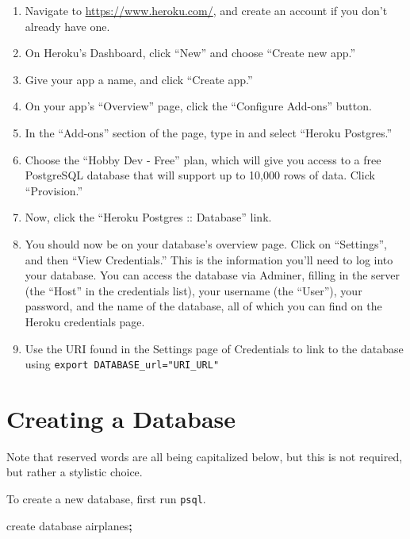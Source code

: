 \documentclass[]{book}
\newenvironment{Shaded}{\begin{snugshade}}{\end{snugshade}}
\newcommand{\KeywordTok}[1]{\textcolor[rgb]{0.13,0.29,0.53}{\textbf{#1}}}
\newcommand{\ExtensionTok}[1]{#1}
\newcommand{\NormalTok}[1]{#1}
\providecommand{\tightlist}{%
  \setlength{\itemsep}{0pt}\setlength{\parskip}{0pt}}
\begin{document}
\begin{enumerate}
\def\labelenumi{\arabic{enumi}.}
\tightlist
\item
  Navigate to \url{https://www.heroku.com/}, and create an account if
  you don't already have one.
\item
  On Heroku's Dashboard, click ``New'' and choose ``Create new app.''
\item
  Give your app a name, and click ``Create app.''
\item
  On your app's ``Overview'' page, click the ``Configure Add-ons''
  button.
\item
  In the ``Add-ons'' section of the page, type in and select ``Heroku
  Postgres.''
\item
  Choose the ``Hobby Dev - Free'' plan, which will give you access to a
  free PostgreSQL database that will support up to 10,000 rows of data.
  Click ``Provision.''
\item
  Now, click the ``Heroku Postgres :: Database'' link.
\item
  You should now be on your database's overview page. Click on
  ``Settings'', and then ``View Credentials.'' This is the information
  you'll need to log into your database. You can access the database via
  Adminer, filling in the server (the ``Host'' in the credentials list),
  your username (the ``User''), your password, and the name of the
  database, all of which you can find on the Heroku credentials page.
\item
  Use the URI found in the Settings page of Credentials to link to the
  database using \texttt{export\ DATABASE\_url="URI\_URL"}
\end{enumerate}

\section{Creating a Database}\label{creating-a-database}

Note that reserved words are all being capitalized below, but this is
not required, but rather a stylistic choice.

To create a new database, first run \texttt{psql}.

\begin{Shaded}
\begin{Highlighting}[]
\ExtensionTok{create}\NormalTok{ database airplanes}\KeywordTok{;}
\end{Highlighting}
\end{Shaded}
\end{document}
